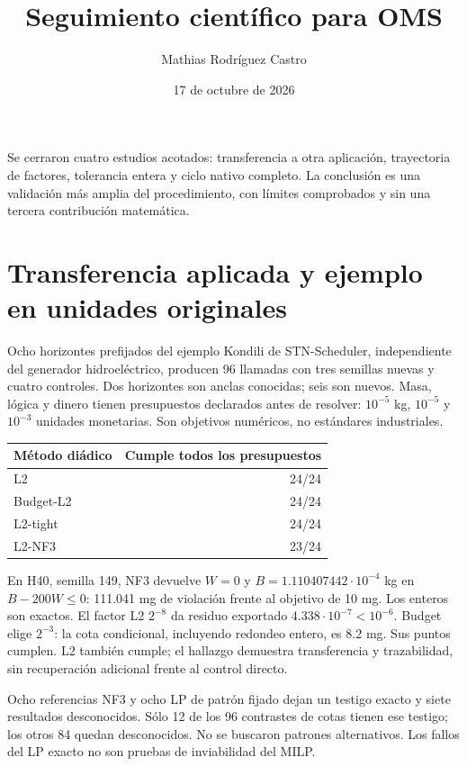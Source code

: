 \documentclass[11pt]{article}
\title{Seguimiento científico para OMS}
\author{Mathias Rodríguez Castro}
\date{17 de octubre de 2026}
\begin{document}
\maketitle
\noindent Se cerraron cuatro estudios acotados: transferencia a otra aplicación,
trayectoria de factores, tolerancia entera y ciclo nativo completo. La conclusión
es una validación más amplia del procedimiento, con límites comprobados y sin
una tercera contribución matemática.

\section*{Transferencia aplicada y ejemplo en unidades originales}
Ocho horizontes prefijados del ejemplo Kondili de STN-Scheduler, independiente del
generador hidroeléctrico, producen 96 llamadas con tres semillas nuevas y cuatro
controles. Dos horizontes son anclas conocidas; seis son nuevos. Masa, lógica y
dinero tienen presupuestos declarados antes de resolver: $10^{-5}$ kg, $10^{-5}$ y
$10^{-3}$ unidades monetarias. Son objetivos numéricos, no estándares industriales.

\begin{center}
\begin{tabular}{lr}\toprule
Método diádico & Cumple todos los presupuestos\\\midrule
L2 &24/24\\ Budget-L2&24/24\\ L2-tight&24/24\\ L2-NF3&23/24\\\bottomrule
\end{tabular}
\end{center}

En H40, semilla 149, NF3 devuelve $W=0$ y $B=1.110407442\cdot10^{-4}$ kg
en $B-200W\le0$: 111.041 mg de violación frente al objetivo de 10 mg.
Los enteros son exactos. El factor L2 $2^{-8}$ da residuo exportado
$4.338\cdot10^{-7}<10^{-6}$. Budget elige $2^{-3}$: la cota condicional,
incluyendo redondeo entero, es $8.2$ mg. Sus puntos cumplen. L2 también cumple;
el hallazgo demuestra transferencia y trazabilidad, sin recuperación adicional
frente al control directo.

Ocho referencias NF3 y ocho LP de patrón fijado dejan un testigo exacto y siete
resultados desconocidos. Sólo 12 de los 96 contrastes de cotas tienen ese testigo;
los otros 84 quedan desconocidos. No se buscaron patrones alternativos. Los fallos
del LP exacto no son pruebas de inviabilidad del MILP.
\end{document}
